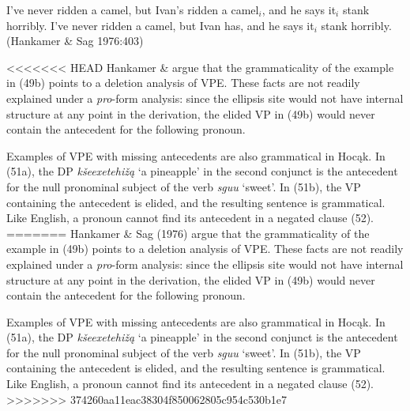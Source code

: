\documentclass[output=paper]{LSP/langsci}
\begin{document}
\begin{singlespacing}
\begin{exe}
\ex
\begin{xlist}
\ex
I've never ridden a camel, but Ivan's ridden a camel$_i$, and he says it$_i$ stank horribly.
\vspace{12pt}
\ex
I've never ridden a camel, but Ivan has, and he says it$_i$ stank horribly. (Hankamer \& Sag 1976:403)
\end{xlist}
\end{exe}
\end{singlespacing}

\begin{exe}
\end{exe}

<<<<<<< HEAD
Hankamer \& \citet{Sag1976} argue that the grammaticality of the example in (49b) points to a deletion analysis of VPE. These facts are not readily explained under a \emph{pro}-form analysis: since the ellipsis site would not have internal structure at any point in the derivation, the elided VP in (49b) would never contain the antecedent for the following pronoun. 

Examples of VPE with missing antecedents are also grammatical in Hocąk. In (51a), the DP \emph{kšeexetehižą} `a pineapple' in the second conjunct is the antecedent for the null pronominal subject of the verb \emph{sguu} `sweet'. In (51b), the VP containing the antecedent is elided, and the resulting sentence is grammatical. Like English, a pronoun cannot find its antecedent in a negated clause (52).
=======
Hankamer \& Sag (1976) argue that the grammaticality of the example in (49b) points to a deletion analysis of VPE. These facts are not readily explained under a \emph{pro}-form analysis: since the ellipsis site would not have internal structure at any point in the derivation, the elided VP in (49b) would never contain the antecedent for the following pronoun. 

Examples of VPE with missing antecedents are also grammatical in Hoc\k{a}k. In (51a), the DP \emph{k\v{s}eexetehi\v{z}\k{a}} `a pineapple' in the second conjunct is the antecedent for the null pronominal subject of the verb \emph{sguu} `sweet'. In (51b), the VP containing the antecedent is elided, and the resulting sentence is grammatical. Like English, a pronoun cannot find its antecedent in a negated clause (52).
>>>>>>> 374260aa11eac38304f850062805c954c530b1e7
\end{document}
